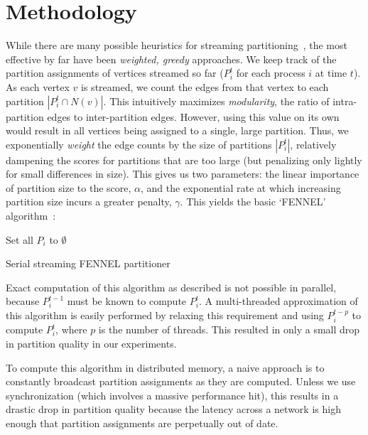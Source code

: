 \section{Methodology}
While there are many possible heuristics for streaming partitioning~\cite{Stanton:2012:SGP:2339530.2339722}, the most effective by far have been \emph{weighted, greedy} approaches. We keep track of the partition assignments of vertices streamed so far ($P_i^t$ for each process $i$ at time $t$). As each vertex $v$ is streamed, we count the edges from that vertex to each partition $|P_i^t \cap N(v)|$. This intuitively maximizes \emph{modularity}, the ratio of intra-partition edges to inter-partition edges. However, using this value on its own would result in all vertices being assigned to a single, large partition. Thus, we exponentially \emph{weight} the edge counts by the size of partitions $|P_i^t|$, relatively dampening the scores for partitions that are too large (but penalizing only lightly for small differences in size). This gives us two parameters: the linear importance of partition size to the score, $\alpha$, and the exponential rate at which increasing partition size incurs a greater penalty, $\gamma$. This yields the basic `FENNEL' algorithm~\cite{tsourakakis2012fennel}:

\begin{algorithm}
 Set all $P_i$ to $\emptyset$\;
 \caption{Serial streaming FENNEL partitioner}
\end{algorithm}

Exact computation of this algorithm as described is not possible in parallel, because $P_i^{t-1}$ must be known to compute $P_i^t$. A multi-threaded approximation of this algorithm is easily performed by relaxing this requirement and using $P_i^{t-p}$ to compute $P_i^t$, where $p$ is the number of threads. This resulted in only a small drop in partition quality in our experiments.

To compute this algorithm in distributed memory, a naive approach is to constantly broadcast partition assignments as they are computed. Unless we use synchronization (which involves a massive performance hit), this results in a drastic drop in partition quality because the latency across a network is high enough that partition assignments are perpetually out of date. 

